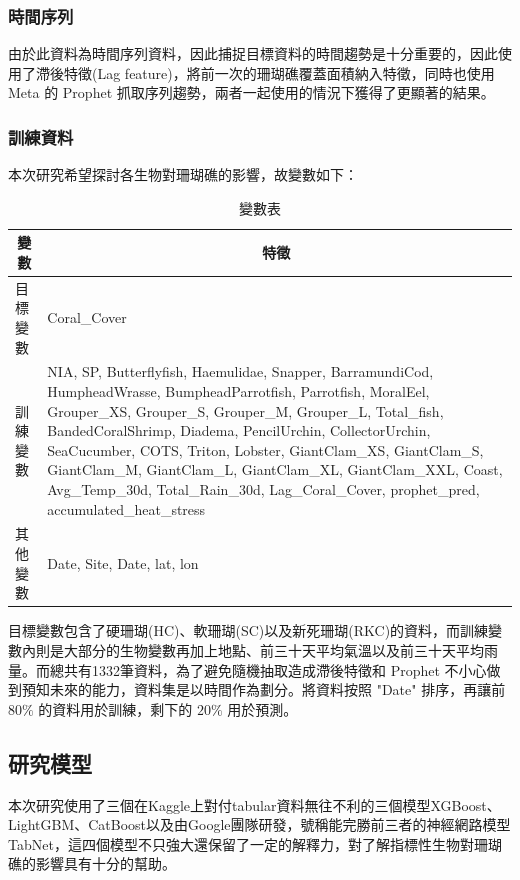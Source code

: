 \documentclass[12pt]{ctexart}
\begin{document}
\subsubsection{時間序列}
由於此資料為時間序列資料，因此捕捉目標資料的時間趨勢是十分重要的，因此使用了滯後特徵(Lag feature)，將前一次的珊瑚礁覆蓋面積納入特徵，同時也使用 Meta 的 Prophet 抓取序列趨勢，兩者一起使用的情況下獲得了更顯著的結果。

\subsubsection{訓練資料}
本次研究希望探討各生物對珊瑚礁的影響，故變數如下：
\begin{table}[H]
    \centering
    \caption{變數表}
    \vspace{2mm}
    \begin{tabularx}{\textwidth}{|l|X|}
        \hline
        \multicolumn{1}{|c|}{\textbf{變數}} & \multicolumn{1}{c|}{\textbf{特徵}} \\ \hline
        目標變數 & Coral\_Cover \\ \hline
        訓練變數 & NIA, SP, Butterflyfish, Haemulidae, Snapper, BarramundiCod, HumpheadWrasse, BumpheadParrotfish, Parrotfish, MoralEel, Grouper\_XS, Grouper\_S, Grouper\_M, Grouper\_L, Total\_fish, BandedCoralShrimp, Diadema, PencilUrchin, CollectorUrchin, SeaCucumber, COTS, Triton, Lobster, GiantClam\_XS, GiantClam\_S, GiantClam\_M, GiantClam\_L, GiantClam\_XL, GiantClam\_XXL, Coast, Avg\_Temp\_30d, Total\_Rain\_30d, Lag\_Coral\_Cover,	prophet\_pred, accumulated\_heat\_stress \\ \hline
        其他變數 & Date, Site, Date, lat, lon \\ \hline
    \end{tabularx}
\end{table}
目標變數包含了硬珊瑚(HC)、軟珊瑚(SC)以及新死珊瑚(RKC)的資料，而訓練變數內則是大部分的生物變數再加上地點、前三十天平均氣溫以及前三十天平均雨量。而總共有1332筆資料，為了避免隨機抽取造成滯後特徵和 Prophet 不小心做到預知未來的能力，資料集是以時間作為劃分。將資料按照 "Date" 排序，再讓前 $80\%$ 的資料用於訓練，剩下的 $20\%$ 用於預測。

\subsection{研究模型}
本次研究使用了三個在Kaggle上對付tabular資料無往不利的三個模型XGBoost、LightGBM、CatBoost以及由Google團隊研發，號稱能完勝前三者的神經網路模型TabNet，這四個模型不只強大還保留了一定的解釋力，對了解指標性生物對珊瑚礁的影響具有十分的幫助。
\end{document}
